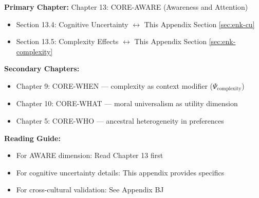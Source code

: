 %
%

%
%
%
%
%

\begin{tcolorbox}[colback=purple!5!white, colframe=purple!75!black,
    title=Chapter Linkage]

\textbf{Primary Chapter:} Chapter 13: CORE-AWARE (Awareness and Attention)
\begin{itemize}[nosep]
\item Section 13.4: Cognitive Uncertainty $\leftrightarrow$ This Appendix Section \ref{sec:enk-cu}
\item Section 13.5: Complexity Effects $\leftrightarrow$ This Appendix Section \ref{sec:enk-complexity}
\end{itemize}

\textbf{Secondary Chapters:}
\begin{itemize}[nosep]
\item Chapter 9: CORE-WHEN --- complexity as context modifier ($\Psi_{\text{complexity}}$)
\item Chapter 10: CORE-WHAT --- moral universalism as utility dimension
\item Chapter 5: CORE-WHO --- ancestral heterogeneity in preferences
\end{itemize}

\textbf{Reading Guide:}
\begin{itemize}[nosep]
\item For AWARE dimension: Read Chapter 13 first
\item For cognitive uncertainty details: This appendix provides specifics
\item For cross-cultural validation: See Appendix BJ
\end{itemize}

\end{tcolorbox}


